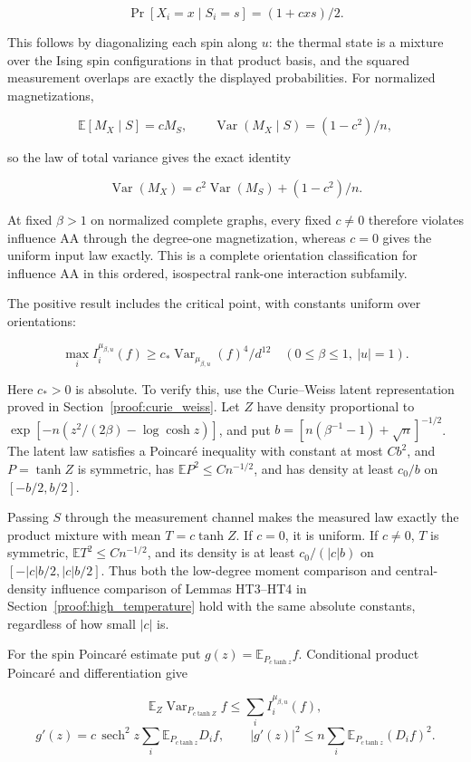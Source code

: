 \[
\Pr[X_i=x\mid S_i=s]=(1+cxs)/2.
\]

This follows by diagonalizing each spin along \(u\): the thermal state
is a mixture over the Ising spin configurations in that product basis,
and the squared measurement overlaps are exactly the displayed
probabilities. For normalized magnetizations,

\[
\mathbb E[M_X\mid S]=cM_S,\qquad
\operatorname{Var}(M_X\mid S)=(1-c^2)/n,
\]

so the law of total variance gives the exact identity

\[
\boxed{\operatorname{Var}(M_X)=c^2\operatorname{Var}(M_S)+(1-c^2)/n.}
\]

At fixed \(\beta>1\) on normalized complete graphs, every fixed
\(c\ne0\) therefore violates influence AA through the degree-one
magnetization, whereas \(c=0\) gives the uniform input law exactly. This
is a complete orientation classification for influence AA in this
ordered, isospectral rank-one interaction subfamily.

The positive result includes the critical point, with constants uniform
over orientations:

\[
\boxed{\max_i I_i^{\mu_{\beta,u}}(f)
\ge c_*\operatorname{Var}_{\mu_{\beta,u}}(f)^4/d^{12}
\quad(0\le\beta\le1,\ |u|=1).}
\]

Here \(c_*>0\) is absolute. To verify this, use the Curie--Weiss latent
representation proved in Section~\ref{proof:curie_weiss}. Let
\(Z\) have density proportional to
\(\exp[-n(z^2/(2\beta)-\log\cosh z)]\), and put
\(b=[n(\beta^{-1}-1)+\sqrt n]^{-1/2}\). The latent law satisfies a
Poincaré inequality with constant at most \(Cb^2\), and \(P=\tanh Z\) is
symmetric, has \(\mathbb EP^2\le Cn^{-1/2}\), and has density at least
\(c_0/b\) on \([-b/2,b/2]\).

Passing \(S\) through the measurement channel makes the measured law
exactly the product mixture with mean \(T=c\tanh Z\). If \(c=0\), it is
uniform. If \(c\ne0\), \(T\) is symmetric,
\(\mathbb ET^2\le Cn^{-1/2}\), and its density is at least
\(c_0/(|c|b)\) on \([-|c|b/2,|c|b/2]\). Thus both the low-degree moment
comparison and central-density influence comparison of Lemmas HT3--HT4
in Section~\ref{proof:high_temperature} hold with the same
absolute constants, regardless of how small \(|c|\) is.

For the spin Poincaré estimate put \(g(z)=\mathbb E_{P_{c\tanh z}}f\).
Conditional product Poincaré and differentiation give

\[
\mathbb E_Z\operatorname{Var}_{P_{c\tanh Z}}f\le\sum_i I_i^{\mu_{\beta,u}}(f),
\] \[
g'(z)=c\,\operatorname{sech}^2z\sum_i\mathbb E_{P_{c\tanh z}}D_if,
\qquad
|g'(z)|^2\le n\sum_i\mathbb E_{P_{c\tanh z}}(D_if)^2.
\]

